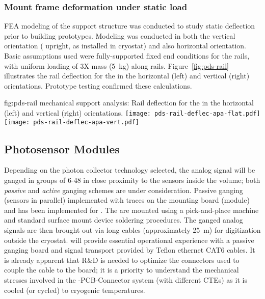 \subsubsection{ Mount frame deformation under static  load}

FEA modeling of the  support structure was conducted to study static deflection 
prior to building prototypes.  Modeling was conducted in both the vertical
 orientation ( upright, as installed in cryostat) and also horizontal orientation.  
Basic assumptions used were fully-supported fixed end conditions for the rails, 
with uniform loading of 3X  mass (\SI{5}{kg}) along rails.  
Figure~\ref{fig:pds-rail} illustrates the rail deflection for the  in the horizontal (left) and vertical (right) orientations.
Prototype testing confirmed these calculations.

\begin{dunefigure}{fig:pds-rail}
{ mechanical support analysis: Rail deflection for the  in the horizontal (left) and vertical (right) orientations.}
	\texttt{[image: pds-rail-deflec-apa-flat.pdf]} 
	\texttt{[image: pds-rail-deflec-apa-vert.pdf]}\\
\end{dunefigure}


\subsection{Photosensor Modules}
\label{sec:fdsp-pd-assy-psm}

Depending on the photon collector  technology selected, the  analog signal will be ganged in groups of 6-48 in close proximity to the sensors inside the
\lar volume; both {\it passive} and {\it active} ganging schemes are under consideration.  Passive ganging (sensors in parallel) implemented with traces on the  mounting board (module) and has been implemented for .  The  are mounted using a pick-and-place machine and standard surface mount device soldering procedures. 
 The ganged analog signals are then brought out via long cables (approximately \SI{25}{m}) for digitization outside the cryostat.
  will provide essential operational experience with a passive ganging board and signal transport provided by Teflon ethernet CAT6 cables.
It is already apparent that R\&D is needed to optimize the connectors used to couple the cable to the board;  it is a priority to understand the 
mechanical stresses involved in the -PCB-Connector system (with different CTEs) as it is cooled (or cycled) to cryogenic temperatures.
 
